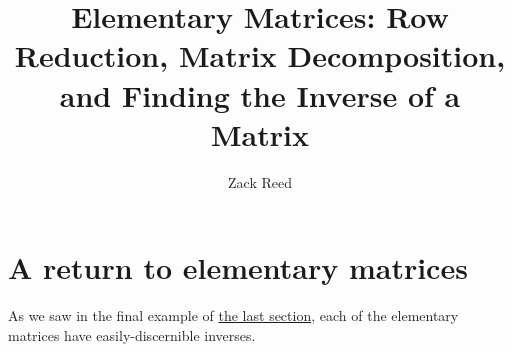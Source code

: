 \documentclass{ximera}
\author{Zack Reed}
\title{Elementary Matrices: Row Reduction, Matrix Decomposition, and Finding the Inverse of a Matrix}
\begin{document}
\begin{abstract}



\end{abstract}
\maketitle

 
\section*{A return to elementary matrices}

As we saw in the final example of \href{https://ximera.osu.edu/appliedlinearalgebra/c4ChapterFour/learningActivities/m4LearningActivities/elementaryMatrices/elementaryMatrices}{the last section}, each of the elementary matrices have easily-discernible inverses. 
\end{document}
